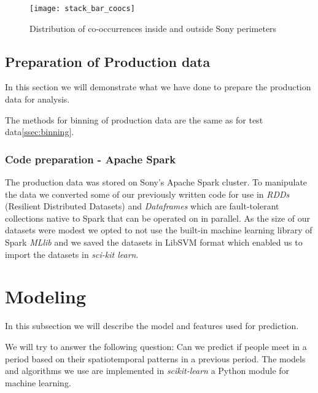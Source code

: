 \begin{figure}[H]
    \hspace*{-1.0cm}
    \centering
    \texttt{[image: stack\_bar\_coocs]}
    \caption{Distribution of co-occurrences inside and outside Sony perimeters}
    \label{fig:dist_coocs_sony}
\end{figure}

\subsection{Preparation of Production data}
In this section we will demonstrate what we have done to prepare the production data for analysis.

The methods for binning of production data are the same as for test data\ref{ssec:binning}.

\subsubsection{Code preparation - Apache Spark}
The production data was stored on Sony's Apache Spark\cite{spark} cluster.
To manipulate the data we converted some of our previously written code for use in \textit{RDDs} (Resilient Distributed Datasets) and \textit{Dataframes} which are fault-tolerant collections native to Spark that can be operated on in parallel.
As the size of our datasets were modest we opted to not use the built-in machine learning library of Spark \textit{MLlib} and we saved the datasets in LibSVM format which enabled us to import the datasets in \textit{sci-kit learn}.

\section{Modeling}
In this subsection we will describe the model and features used for prediction.

We will try to answer the following question: Can we predict if people meet in a period based on their spatiotemporal patterns in a previous period.
The models and algorithms we use are implemented in \textit{scikit-learn}\cite{scikit-learn} a Python module for machine learning. 


